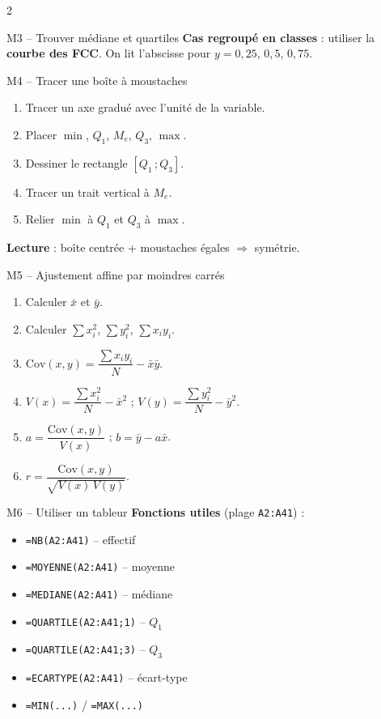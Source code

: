 \documentclass[11pt,a4paper]{article}
\begin{document}
\begin{multicols}{2}
\begin{vignetteMethode}{M3 -- Trouver médiane et quartiles}
\medskip
\textbf{Cas regroupé en classes} : utiliser la \textbf{courbe des FCC}. On lit l'abscisse pour $y=0{,}25$, $0{,}5$, $0{,}75$.
\end{vignetteMethode}

\begin{vignetteMethode}{M4 -- Tracer une boîte à moustaches}
\begin{enumerate}[leftmargin=*,itemsep=1pt]
  \item Tracer un axe gradué avec l'unité de la variable.
  \item Placer $\min$, $Q_1$, $M_e$, $Q_3$, $\max$.
  \item Dessiner le rectangle $[Q_1\,;Q_3]$.
  \item Tracer un trait vertical à $M_e$.
  \item Relier $\min$ à $Q_1$ et $Q_3$ à $\max$.
\end{enumerate}

\medskip
\textbf{Lecture} : boîte centrée + moustaches égales $\Rightarrow$ symétrie.
\end{vignetteMethode}

\begin{vignetteMethode}{M5 -- Ajustement affine par moindres carrés}
\begin{enumerate}[leftmargin=*,itemsep=1pt]
  \item Calculer $\bar{x}$ et $\bar{y}$.
  \item Calculer $\sum x_i^2$, $\sum y_i^2$, $\sum x_i y_i$.
  \item $\mathrm{Cov}(x,y)=\dfrac{\sum x_i y_i}{N}-\bar{x}\bar{y}$.
  \item $V(x)=\dfrac{\sum x_i^2}{N}-\bar{x}^2$ ; $V(y)=\dfrac{\sum y_i^2}{N}-\bar{y}^2$.
  \item $a = \dfrac{\mathrm{Cov}(x,y)}{V(x)}$ ; $b = \bar{y} - a\bar{x}$.
  \item $r = \dfrac{\mathrm{Cov}(x,y)}{\sqrt{V(x)\,V(y)}}$.
\end{enumerate}
\end{vignetteMethode}

\begin{vignetteMethode}{M6 -- Utiliser un tableur}
\textbf{Fonctions utiles} (plage \texttt{A2:A41}) :
\begin{itemize}[leftmargin=*,itemsep=1pt]
  \item \texttt{=NB(A2:A41)} -- effectif
  \item \texttt{=MOYENNE(A2:A41)} -- moyenne
  \item \texttt{=MEDIANE(A2:A41)} -- médiane
  \item \texttt{=QUARTILE(A2:A41;1)} -- $Q_1$
  \item \texttt{=QUARTILE(A2:A41;3)} -- $Q_3$
  \item \texttt{=ECARTYPE(A2:A41)} -- écart-type
  \item \texttt{=MIN(...)} / \texttt{=MAX(...)}
\end{itemize}


\end{vignetteMethode}
\end{multicols}
\end{document}
